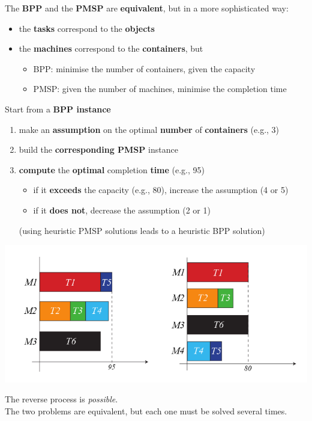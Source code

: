 \documentclass[11pt]{article}
\begin{document}
	The \textbf{BPP} and the \textbf{PMSP} are \textbf{equivalent}, but in a more sophisticated way:
	\begin{itemize}
		\item the \textbf{tasks} correspond to the \textbf{objects}
		\item the \textbf{machines} correspond to the \textbf{containers}, but
		\begin{itemize}
			\item BPP: minimise the number of containers, given the capacity
			\item PMSP: given the number of machines, minimise the completion time
		\end{itemize}
	\end{itemize}
	Start from a \textbf{BPP instance}
	\begin{enumerate}
		\item make an \textbf{assumption} on the optimal \textbf{number} of \textbf{containers} (e.g., 3)
		\item build the \textbf{corresponding PMSP} instance
		\item \textbf{compute} the \textbf{optimal} completion \textbf{time} (e.g., 95)
		\begin{itemize}
			\item if it \textbf{exceeds} the capacity (e.g., 80), increase the assumption (4 or 5)
			\item if it \textbf{does not}, decrease the assumption (2 or 1)
		\end{itemize}
		(using heuristic PMSP solutions leads to a heuristic BPP solution)
	\end{enumerate}
	
	\begin{center}
		\includegraphics[width=0.8\columnwidth]{img/interlude53}
	\end{center}
	
	The reverse process is \textit{possible}.\\
	
	The two problems are equivalent, but each one must be solved several times.\\
	
\end{document}
